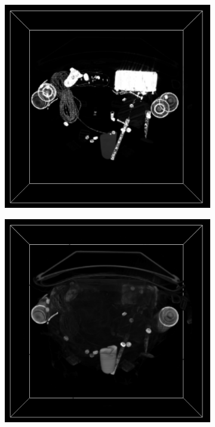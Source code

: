 \begin{figure}[h!]
    \centering
    \captionsetup{justification=centering,margin=0.5cm}
    \begin{subfigure}[t]{0.32\textwidth}
        \includegraphics[width=\textwidth]{img/bag-MIP.png}
        \caption{ }
    \end{subfigure}
    \begin{subfigure}[t]{0.32\textwidth}
        \includegraphics[width=\textwidth]{img/bag-Composition.png}

\end{subfigure}
\end{figure}
